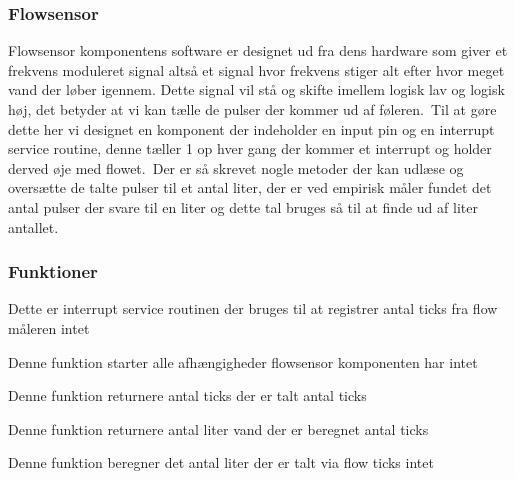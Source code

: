 \subsubsection{Flowsensor}
Flowsensor komponentens software er designet ud fra dens hardware som giver et frekvens moduleret signal altså et signal hvor frekvens stiger alt efter hvor meget vand der løber igennem. Dette signal vil stå og skifte imellem logisk lav og logisk høj, det betyder at vi kan tælle de pulser der kommer ud af føleren.\
Til at gøre dette her vi designet en komponent der indeholder en input pin og en interrupt service routine, denne tæller 1 op hver gang der kommer et interrupt og holder derved øje med flowet.\
Der er så skrevet nogle metoder der kan udlæse og oversætte de talte pulser til et antal liter, der er ved empirisk måler fundet det antal pulser der svare til en liter og dette tal bruges så til at finde ud af liter antallet.

\subsubsection{Funktioner}

{Dette er interrupt service routinen der bruges til at registrer antal ticks fra flow måleren}
{intet}
{
}

{Denne funktion starter alle afhængigheder flowsensor komponenten har}
{intet}
{
}

{Denne funktion returnere antal ticks der er talt}
{antal ticks}
{
}

{Denne funktion returnere antal liter vand der er beregnet}
{antal ticks}
{
}

{Denne funktion beregner det antal liter der er talt via flow ticks}
{intet}
{
}
